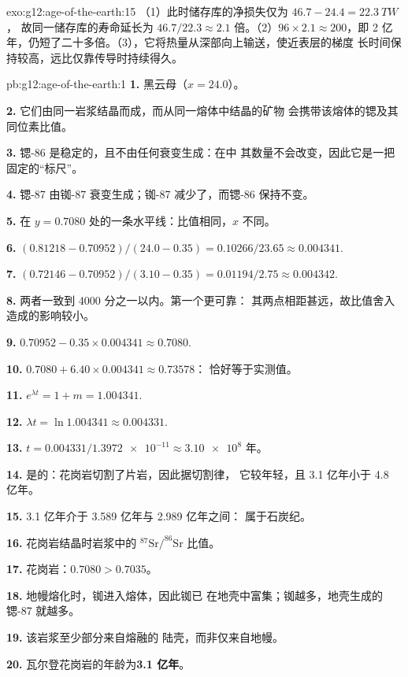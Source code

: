 \begin{solution}{exo:g12:age-of-the-earth:15}
（1）此时储存库的净损失仅为 $46.7 - 24.4 = \qty{22.3}{TW}$，
故同一储存库的寿命延长为 $46.7/22.3 \approx 2.1$ 倍。（2）$96 \times 2.1 \approx
200$，即 2 亿年，仍短了二十多倍。（3），它将热量从深部向上输送，使近表层的梯度
长时间保持较高，远比仅靠传导时持续得久。
\end{solution}

\begin{solution}{pb:g12:age-of-the-earth:1}
\textbf{1.} 黑云母（$x = 24.0$）。

\textbf{2.} 它们由同一岩浆结晶而成，而从同一熔体中结晶的矿物
会携带该熔体的锶及其同位素比值。

\textbf{3.} 锶-86 是稳定的，且不由任何衰变生成：在中
其数量不会改变，因此它是一把固定的“标尺”。

\textbf{4.} 锶-87 由铷-87 衰变生成；铷-87
减少了，而锶-86 保持不变。

\textbf{5.} 在 $y = 0.7080$ 处的一条水平线：比值相同，$x$ 不同。

\textbf{6.} $(0.81218 - 0.70952)/(24.0 - 0.35) = 0.10266/23.65 \approx
0.004341$.

\textbf{7.} $(0.72146 - 0.70952)/(3.10 - 0.35) = 0.01194/2.75 \approx
0.004342$.

\textbf{8.} 两者一致到 4000 分之一以内。第一个更可靠：
其两点相距甚远，故比值舍入造成的影响较小。

\textbf{9.} $0.70952 - 0.35 \times 0.004341 \approx 0.7080$.

\textbf{10.} $0.7080 + 6.40 \times 0.004341 \approx 0.73578$：
恰好等于实测值。

\textbf{11.} $e^{\lambda t} = 1 + m = 1.004341$.

\textbf{12.} $\lambda t = \ln 1.004341 \approx 0.004331$.

\textbf{13.} $t = 0.004331/\num{1.3972e-11} \approx \num{3.10e8}$ 年。

\textbf{14.} 是的：花岗岩切割了片岩，因此据切割律，
它较年轻，且 3.1 亿年小于
4.8 亿年。

\textbf{15.} 3.1 亿年介于 3.589 亿年与 2.989 亿年之间：
属于石炭纪。

\textbf{16.} 花岗岩结晶时岩浆中的
$^{87}\mathrm{Sr}/^{86}\mathrm{Sr}$ 比值。

\textbf{17.} 花岗岩：$0.7080 > 0.7035$。

\textbf{18.} 地幔熔化时，铷进入熔体，因此铷已
在地壳中富集；铷越多，地壳生成的
锶-87 就越多。

\textbf{19.} 该岩浆至少部分来自熔融的
陆壳，而非仅来自地幔。

\textbf{20.} 瓦尔登花岗岩的年龄为\textbf{3.1 亿年}。
\end{solution}
